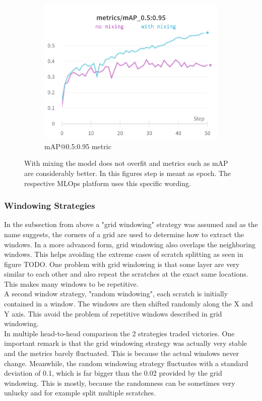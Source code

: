 \begin{figure}[!h]
\begin{subfigure}{0.33\textwidth}
  \includegraphics[width=\linewidth]{images/implementation/windowing/mixing/mixing_big_map}
  \caption{mAP@0.5:0.95 metric}
\end{subfigure}
\caption{With mixing the model does not overfit and metrics such as mAP are considerably better. In this figures step is meant as epoch. The respective MLOps platform uses this specific wording.}
\label{impl:mixing}
\end{figure}


\subsubsection{Windowing Strategies}
In the subsection from above a "grid windowing" strategy was assumed and as the name suggests, the corners of a grid are used to determine how to extract the windows. In a more advanced form, grid windowing also overlaps the neighboring windows. This helps avoiding the extreme cases of scratch splitting as seen in figure TODO. One problem with grid windowing is that some layer are very similar to each other and also repeat the scratches at the exact same locations. This makes many windows to be repetitive.\\
A second window strategy, "random windowing", each scratch is initially contained in a window. The windows are then shifted randomly along the X and Y axis. This avoid the problem of repetitive windows described in grid windowing. \\
In multiple head-to-head comparison the 2 strategies traded victories. One important remark is that the grid windowing strategy was actually very stable and the metrics barely fluctuated. This is because the actual windows never change. Meanwhile, the random windowing strategy fluctuates with a standard deviation of 0.1, which is far bigger than the 0.02 provided by the grid windowing. This is mostly, because the randomness can be sometimes very unlucky and for example split multiple scratches. \\

